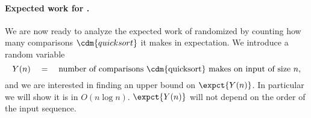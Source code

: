{%


\paragraph*{Expected work for \Qsort{}.}
We are now ready to analyze the expected work of randomized \qsort{}
by counting how many comparisons $\cdm{\qsort{}}$ it makes in
expectation.  
%
We introduce a random variable
\begin{equation*}
 Y(n) ~~~=~~~\mbox{number of comparisons \cdm{\qsort{}} makes on input
   of size}~n,
\end{equation*}
and we are interested in finding an upper bound on $\expct{Y(n)}$.  In
particular we will show it is in $O(n \log n)$.
%
 $\expct{Y(n)}$ will not depend on the order of the input sequence.

}
